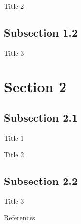 \documentclass[aspectratio=169]{beamer}
\begin{document}
  \begin{frame}{Title 2}
  \begin{adjustwidth}{13mm}{0mm}
    \lipsum[2]
  \end{adjustwidth}
  \end{frame}

  \subsection{Subsection 1.2}
  \begin{frame}[plain]{Title 3}
  \begin{adjustwidth}{13mm}{0mm}
    \lipsum[3]
  \end{adjustwidth}
  \end{frame}

\section{Section 2}
  \subsection{Subsection 2.1}
  \begin{frame}{Title 1}
  \begin{adjustwidth}{13mm}{0mm}
    \lipsum[4]
  \end{adjustwidth}
  \end{frame}

  \begin{frame}{Title 2}
  \begin{adjustwidth}{13mm}{0mm}
    \lipsum[5]
  \end{adjustwidth}
  \end{frame}

  \subsection{Subsection 2.2}
  \begin{frame}[plain]{Title 3}
  \begin{adjustwidth}{13mm}{0mm}
    \lipsum[6]
  \end{adjustwidth}
  \end{frame}

  \begin{frame}{References}
  \begin{adjustwidth}{13mm}{0mm}
    \printbibliography[heading=none]
  \end{adjustwidth}
  \end{frame}
\end{document}
